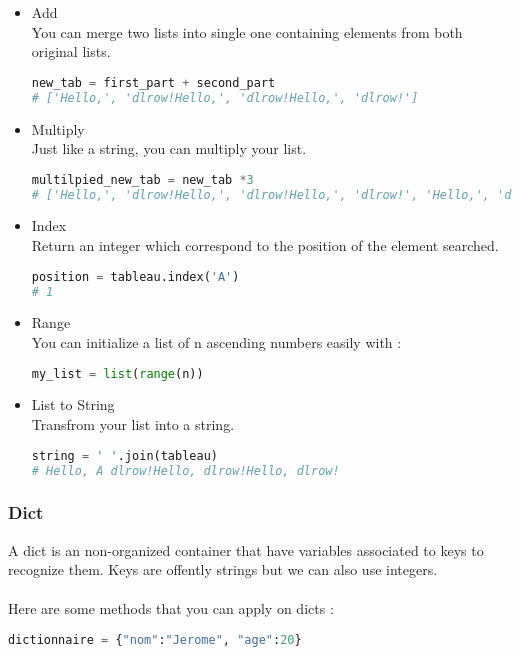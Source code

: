 \documentclass[a4paper, 12pt, titlepage]{scrartcl} %
\begin{document}
\begin{itemize}
\item Add \\
You can merge two lists into single one containing elements from both original lists.
\begin{lstlisting}[language=Python]
new_tab = first_part + second_part
# ['Hello,', 'dlrow!Hello,', 'dlrow!Hello,', 'dlrow!']
\end{lstlisting} \vspace{5mm}

\item Multiply \\
Just like a string, you can multiply your list.
\begin{lstlisting}[language=Python]
multilpied_new_tab = new_tab *3
# ['Hello,', 'dlrow!Hello,', 'dlrow!Hello,', 'dlrow!', 'Hello,', 'dlrow!Hello,', 'dlrow!Hello,', 'dlrow!', 'Hello,', 'dlrow!Hello,', 'dlrow!Hello,', 'dlrow!']
\end{lstlisting} \vspace{5mm}

\item Index \\
Return an integer which correspond to the position of the element searched.
\begin{lstlisting}[language=Python]
position = tableau.index('A')
# 1
\end{lstlisting} \vspace{5mm}

\item Range \\
You can initialize a list of n ascending numbers easily with : 
\begin{lstlisting}[language=Python]
my_list = list(range(n))
\end{lstlisting} \vspace{5mm}

\item List to String \\
Transfrom your list into a string.
\begin{lstlisting}[language=Python]
string = ' '.join(tableau)
# Hello, A dlrow!Hello, dlrow!Hello, dlrow!
\end{lstlisting} \vspace{5mm}
\end{itemize}

\subsubsection{Dict}
A dict is an non-organized container that have variables associated to keys to recognize them. Keys are offently strings but we can also use integers.\\ \\
Here are some methods that you can apply on dicts : 
\begin{lstlisting}[language=Python]
dictionnaire = {"nom":"Jerome", "age":20}
\end{lstlisting} \vspace{5mm}
\end{document}

